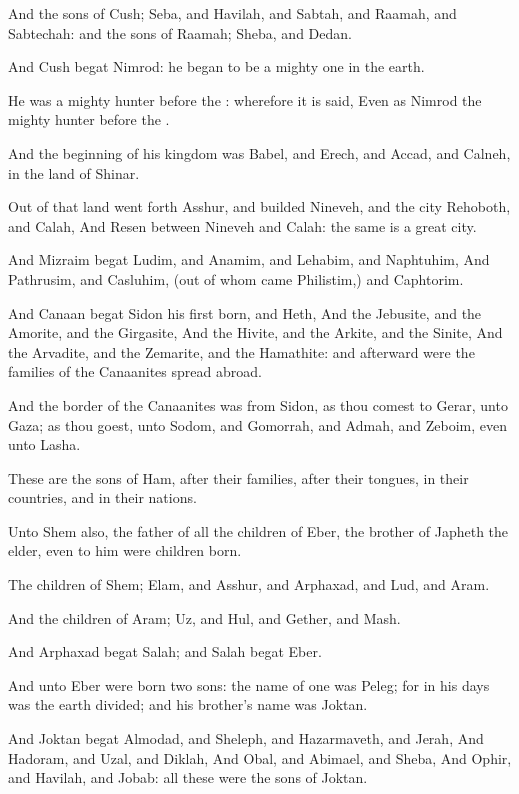 \Verse And the sons of Cush; Seba, and Havilah, and Sabtah, and Raamah, and Sabtechah: and the sons of Raamah; Sheba, and Dedan.

\Verse And Cush begat Nimrod: he began to be a mighty one in the earth.

\Verse He was a mighty hunter before the \LORD: wherefore it is said, Even as Nimrod the mighty hunter before the \LORD.

\Verse And the beginning of his kingdom was Babel, and Erech, and Accad, and Calneh, in the land of Shinar.

\Verse Out of that land went forth Asshur, and builded Nineveh, and the city Rehoboth, and Calah, \Verse And Resen between Nineveh and Calah: the same is a great city.

\Verse And Mizraim begat Ludim, and Anamim, and Lehabim, and Naphtuhim, \Verse And Pathrusim, and Casluhim, (out of whom came Philistim,) and Caphtorim.

\Verse And Canaan begat Sidon his first born, and Heth, \Verse And the Jebusite, and the Amorite, and the Girgasite, \Verse And the Hivite, and the Arkite, and the Sinite, \Verse And the Arvadite, and the Zemarite, and the Hamathite: and afterward were the families of the Canaanites spread abroad.

\Verse And the border of the Canaanites was from Sidon, as thou comest to Gerar, unto Gaza; as thou goest, unto Sodom, and Gomorrah, and Admah, and Zeboim, even unto Lasha.

\Verse These are the sons of Ham, after their families, after their tongues, in their countries, and in their nations.

\Verse Unto Shem also, the father of all the children of Eber, the brother of Japheth the elder, even to him were children born.

\Verse The children of Shem; Elam, and Asshur, and Arphaxad, and Lud, and Aram.

\Verse And the children of Aram; Uz, and Hul, and Gether, and Mash.

\Verse And Arphaxad begat Salah; and Salah begat Eber.

\Verse And unto Eber were born two sons: the name of one was Peleg; for in his days was the earth divided; and his brother's name was Joktan.

\Verse And Joktan begat Almodad, and Sheleph, and Hazarmaveth, and Jerah, \Verse And Hadoram, and Uzal, and Diklah, \Verse And Obal, and Abimael, and Sheba, \Verse And Ophir, and Havilah, and Jobab: all these were the sons of Joktan.


